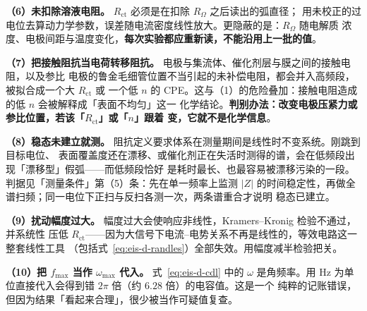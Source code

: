 \begin{pitfall}
\textbf{（6）未扣除溶液电阻。} $R_{\mathrm{ct}}$ 必须是在扣除 $R_{\Omega}$ 之后读出的弧直径；
用未校正的过电位去算动力学参数，误差随电流密度线性放大。更隐蔽的是：$R_{\Omega}$ 随电解质
浓度、电极间距与温度变化，\textbf{每次实验都应重新读，不能沿用上一批的值}。

\textbf{（7）把接触阻抗当电荷转移阻抗。} 电极与集流体、催化剂层与膜之间的接触电阻，以及参比
电极的鲁金毛细管位置不当引起的未补偿电阻，都会并入高频段，被拟合成一个大 $R_{\mathrm{ct}}$ 或
一个低 $n$ 的 CPE。这与（1）的危险叠加：接触电阻造成的低 $n$ 会被解释成「表面不均匀」这一
化学结论。\textbf{判别办法：改变电极压紧力或参比位置，若该「$R_{\mathrm{ct}}$」或「$n$」跟着
变，它就不是化学信息}。

\textbf{（8）稳态未建立就测。} 阻抗定义要求体系在测量期间是线性时不变系统。刚跳到目标电位、
表面覆盖度还在漂移、或催化剂正在失活时测得的谱，会在低频段出现「漂移型」假弧——而低频段恰好
是耗时最长、也最容易被漂移污染的一段。判据见「测量条件」第（5）条：先在单一频率上监测
$\lvert Z\rvert$ 的时间稳定性，再做全谱扫频；同一电位下正扫与反扫各测一次，两条谱重合才说明
稳态已建立。

\textbf{（9）扰动幅度过大。} 幅度过大会使响应非线性，Kramers--Kronig 检验不通过，并系统性
压低 $R_{\mathrm{ct}}$——因为大信号下电流–电势关系不再是线性的，等效电路这一整套线性工具
（包括式~\eqref{eq:eis-d-randles}）全部失效。用幅度减半检验把关。

\textbf{（10）把 $f_{\max}$ 当作 $\omega_{\max}$ 代入。} 式~\eqref{eq:eis-d-cdl} 中的
$\omega$ 是角频率。用 Hz 为单位直接代入会得到错 $2\pi$ 倍（约 $6.28$ 倍）的电容值。这是一个
纯粹的记账错误，但因为结果「看起来合理」，很少被当作可疑值复查。
\end{pitfall}

